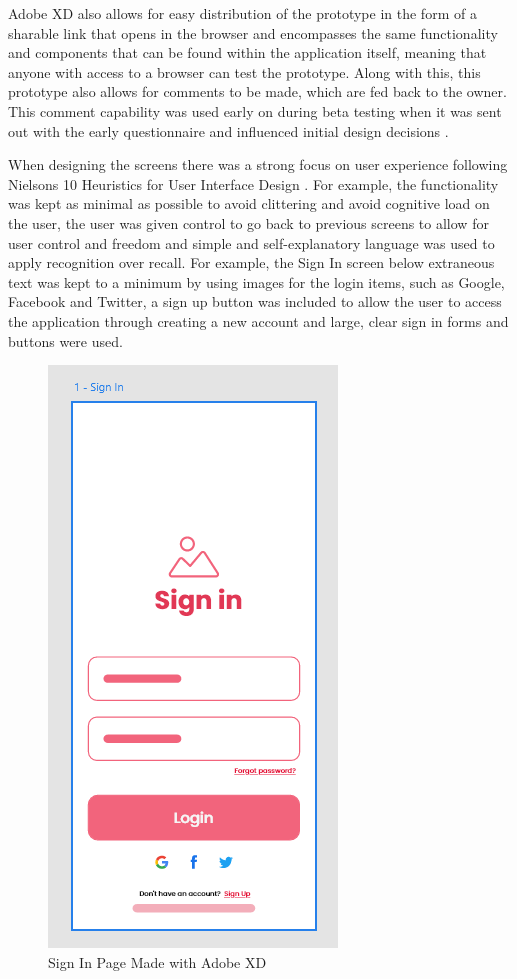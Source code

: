 \documentclass[12pt]{article}
\begin{document}
	
	Adobe XD also allows for easy distribution of the prototype in the form of a sharable link that opens in the browser and encompasses the same functionality and components that can be found within the application itself, meaning that anyone with access to a browser can test the prototype. Along with this, this prototype also allows for comments to be made, which are fed back to the owner. This comment capability was used early on during beta testing when it was sent out with the early questionnaire and influenced initial design decisions \cite{smashing-magazine}.
	
	When designing the screens there was a strong focus on user experience following Nielsons 10 Heuristics for User Interface Design \cite{nielson-normal-group-2020} . For example, the functionality was kept as minimal as possible to avoid clittering and avoid cognitive load on the user, the user was given control to go back to previous screens to allow for user control and freedom and simple and self-explanatory language was used to apply recognition over recall. For example, the Sign In screen below extraneous text was kept to a minimum by using images for the login items, such as Google, Facebook and Twitter, a sign up button was included to allow the user to access the application through creating a new account and large, clear sign in forms and buttons were used.
	
	\begin{figure}[H]
		\centering
		\includegraphics[scale=0.85]{images/sign-in.png}
		\caption{Sign In Page Made with Adobe XD}
		\label{fig:sign-in}
	\end{figure}
	
\end{document}
